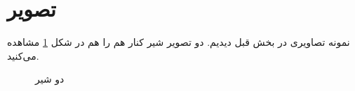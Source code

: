 \section{تصویر}
نمونه تصاویری در بخش قبل دیدیم. دو تصویر شیر کنار هم را هم در شکل \ref{fig:twolion} مشاهده می‌کنید.
\begin{figure}[t]
\centering 
{}
\caption{دو شیر}
\label{fig:twolion} %
\end{figure}